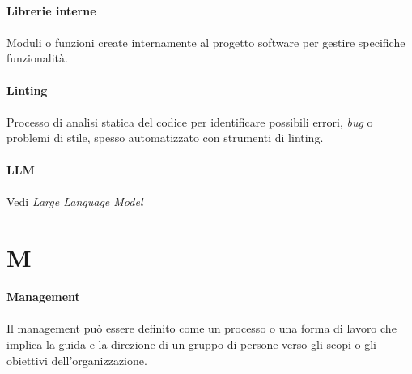\documentclass[10pt, a4paper]{article}
\begin{document}
\vspace{2em}
\paragraph{Librerie interne}\noindent\hrulefill
\paragraph{}Moduli o funzioni create internamente al progetto software per gestire specifiche funzionalità.

\vspace{2em}
\paragraph{Linting}\noindent\hrulefill
\paragraph{}Processo di analisi statica del codice per identificare possibili errori, \textit{bug\pg} o problemi di stile, spesso automatizzato con strumenti di linting.


\vspace{2em}
\paragraph{LLM}\noindent\hrulefill
\paragraph{}Vedi \textit{Large Language Model\pg}





\newpage
\section{M}

\vspace{2em}
\paragraph{Management}\noindent\hrulefill
\paragraph{}Il management può essere definito come un processo o una forma di lavoro che implica la guida e la direzione di un gruppo di persone verso gli scopi o gli obiettivi dell’organizzazione.
\end{document}

